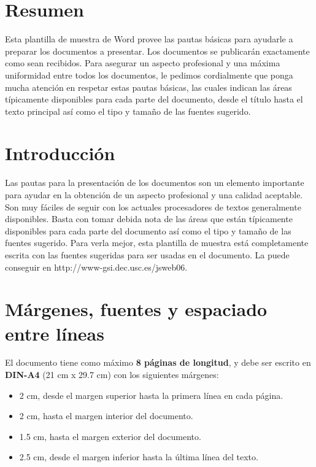 \documentclass[10pt,a4paper,twoside]{article}
\begin{document}
\begin{multicols}{2}
    \section*{Resumen}

    Esta plantilla de muestra de Word provee las pautas básicas para ayudarle a preparar los documentos a presentar. Los documentos se publicarán exactamente como sean recibidos. Para asegurar un aspecto profesional y una máxima uniformidad entre todos los documentos, le pedimos cordialmente que ponga mucha atención en respetar estas pautas básicas, las cuales indican las áreas típicamente disponibles para cada parte del documento, desde el título hasta el texto principal así como el tipo y tamaño de las fuentes sugerido.

    \section{Introducción}

    Las pautas para la presentación de los documentos son un elemento importante para ayudar en la obtención de un aspecto profesional y una calidad aceptable. Son muy fáciles de seguir con los actuales procesadores de textos generalmente disponibles. Basta con tomar debida nota de las áreas que están típicamente disponibles para cada parte del documento así como el tipo y tamaño de las fuentes sugerido. Para verla mejor, esta plantilla de muestra está completamente escrita con las fuentes sugeridas para ser usadas en el documento. La puede conseguir en http://www-gsi.dec.usc.es/jsweb06.

    \section{Márgenes, fuentes y espaciado entre líneas}

    El documento tiene como máximo \textbf{8 páginas de longitud}, y debe ser escrito en \textbf{DIN-A4} (21 cm x 29.7 cm) con los siguientes márgenes:

    \begin{itemize}
        \item 2 cm, desde el margen superior hasta la primera línea en cada página.
        \item 2 cm, hasta el margen interior del documento.
        \item 1.5 cm, hasta el margen exterior del documento.
        \item 2.5 cm, desde el margen inferior hasta la última línea del texto.
    \end{itemize}


\end{multicols}
\end{document}
